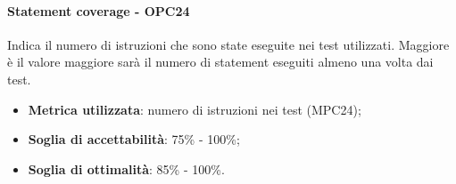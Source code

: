 \documentclass[PdQ.tex]{subfiles}
\begin{document}
			\paragraph{Statement coverage - OPC24}
				Indica il numero di istruzioni che sono state eseguite nei test utilizzati. Maggiore è il valore maggiore sarà il numero di statement eseguiti almeno
				una volta dai test.
				\begin{itemize}
					\item \textbf{Metrica utilizzata}: numero di istruzioni nei test (MPC24);
					\item \textbf{Soglia di accettabilità}: 75\% - 100\%;
					\item \textbf{Soglia di ottimalità}: 85\% - 100\%.
				\end{itemize}
\end{document}
